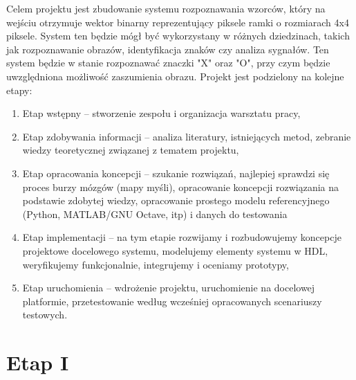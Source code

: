 \documentclass[a4paper, titleauthor]{mwart}
\begin{document}
Celem projektu jest zbudowanie systemu rozpoznawania wzorców, który na wejściu otrzymuje wektor binarny reprezentujący piksele ramki o rozmiarach 4x4 piksele. System ten będzie mógł być wykorzystany w różnych dziedzinach, takich jak rozpoznawanie obrazów, identyfikacja znaków czy analiza sygnałów. Ten system będzie w stanie rozpoznawać znaczki "X" oraz "O", przy czym będzie uwzględniona możliwość zaszumienia obrazu. Projekt jest podzielony na kolejne etapy:

\renewcommand{\labelenumi}{\Roman{enumi}}
\begin{enumerate}\setlength{\itemsep}{0.2\baselineskip} 
	\item Etap wstępny – stworzenie zespołu i organizacja warsztatu pracy, 
	\item Etap zdobywania informacji – analiza literatury, istniejących metod, zebranie wiedzy teoretycznej związanej z tematem projektu, 
	\item Etap opracowania koncepcji – szukanie rozwiązań, najlepiej sprawdzi się proces burzy mózgów (mapy myśli), opracowanie koncepcji rozwiązania  na podstawie zdobytej wiedzy, opracowanie prostego modelu referencyjnego (Python, MATLAB/GNU Octave, itp) i danych do testowania  
	\item Etap implementacji – na tym etapie rozwijamy i rozbudowujemy koncepcje projektowe docelowego systemu, modelujemy elementy systemu w HDL, weryfikujemy funkcjonalnie, integrujemy i oceniamy prototypy, 
	\item Etap uruchomienia – wdrożenie projektu, uruchomienie na docelowej platformie, przetestowanie według wcześniej opracowanych scenariuszy testowych. 
 \newline
 \newline
\end{enumerate}
\section{\large Etap I}


\label{sec:organizacja}
\end{document}
